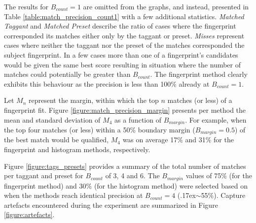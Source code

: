 \documentclass[thesis.tex]{subfiles}
\begin{document}
The results for $B_{count}=1$ are omitted from the graphs, and instead, presented in Table \ref{table:match_precision_count1} with a few additional statistics. \emph{Matched Taggant} and \emph{Matched Preset} describe the ratio of cases where the fingerprint corresponded its matches either only by the taggant or preset. \emph{Misses} represent cases where neither the taggant nor the preset of the matches corresponded the subject fingerprint. In a few cases more than one of a fingerprint's candidates would be given the same best score resulting in situation where the number of matches could potentially be greater than $B_{count}$. The fingerprint method clearly exhibits this behaviour as the precision is less than 100\% already at $B_{count}=1$.

Let $M_n$ represent the margin, within which the top $n$ matches (or less) of a fingerprint fit. Figure \ref{figure:match_precision_margin} presents per method the mean and standard deviation of $M_4$ as a function of $B_{margin}$. For example, when the top four matches (or less) within a 50\% boundary margin ($B_{margin}=0.5$) of the best match would be qualified, $M_4$ was on average 17\% and 31\% for the fingerprint and histogram methods, respectively.

Figure \ref{figure:tags_presets} provides a summary of the total number of matches per taggant and preset for $B_{count}$ of 3, 4 and 6. The $B_{margin}$ values of 75\% (for the fingerprint method) and 30\% (for the histogram method) were selected based on when the methods reach identical precision at $B_{count}=4$ ({\raise.17ex\hbox{$\scriptstyle\sim$}}55\%). Capture artefacts encountered during the experiment are summarized in Figure \ref{figure:artefacts}.
\end{document}

